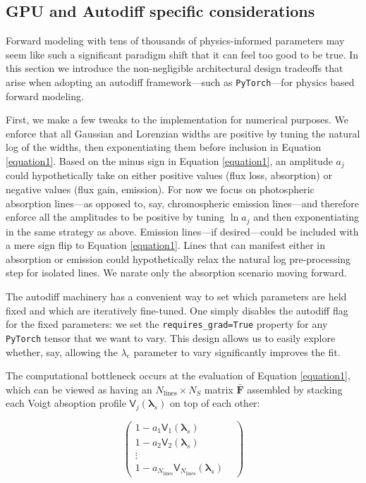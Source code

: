 \documentclass[twocolumn]{aastex631}
\begin{document}
\subsection{GPU and Autodiff specific considerations}\label{gpuConsiderations}

Forward modeling with tens of thousands of physics-informed parameters may seem like such a significant paradigm shift that it can feel too good to be true.  In this section we introduce the non-negligible architectural design tradeoffs that arise when adopting an autodiff framework---such as \texttt{PyTorch}---for physics based forward modeling.

First, we make a few tweaks to the implementation for numerical purposes. We enforce that all Gaussian and Lorenzian widths are positive by tuning the natural log of the widths, then exponentiating them before inclusion in Equation \ref{equation1}. Based on the minus sign in Equation \ref{equation1}, an amplitude $a_j$ could hypothetically take on either positive values (flux loss, absorption) or negative values (flux gain, emission).  For now we focus on photospheric absorption lines---as opposed to, say, chromospheric emission lines---and therefore enforce all the amplitudes to be positive by tuning $\ln{a_j}$ and then exponentiating in the same strategy as above.  Emission lines---if desired---could be included with a mere sign flip to Equation \ref{equation1}.  Lines that can manifest either in absorption or emission could hypothetically relax the natural log pre-processing step for isolated lines.  We narate only the absorption scenario moving forward.

The autodiff machinery has a convenient way to set which parameters are held fixed and which are iteratively fine-tuned.  One simply disables the autodiff flag for the fixed parameters: we set the \texttt{requires\_grad=True} property for any \texttt{PyTorch} tensor that we want to vary. This design allows us to easily explore whether, say, allowing the $\lambda_\mathrm{c}$ parameter to vary significantly improves the fit.

The computational bottleneck occurs at the evaluation of Equation \ref{equation1}, which can be viewed as having an $N_{\mathrm{lines}}\times N_{S}$ matrix $\bm{\bar{F}}$ assembled by stacking each Voigt absoption profile $\mathsf{V}_j(\bm{\lambda}_s)$ on top of each other:

\begin{equation}
    \begin{pmatrix}
        1 - a_1 \mathsf{V}_1(\bm{\lambda}_s)                                       & \\
        1 - a_2 \mathsf{V}_2(\bm{\lambda}_s)                                       & \\
        \vdots                                                                     & \\
        1 - a_{N_{\mathrm{lines}}} \mathsf{V}_{N_{\mathrm{lines}}}(\bm{\lambda}_s) &
    \end{pmatrix}
\end{equation}
\end{document}
